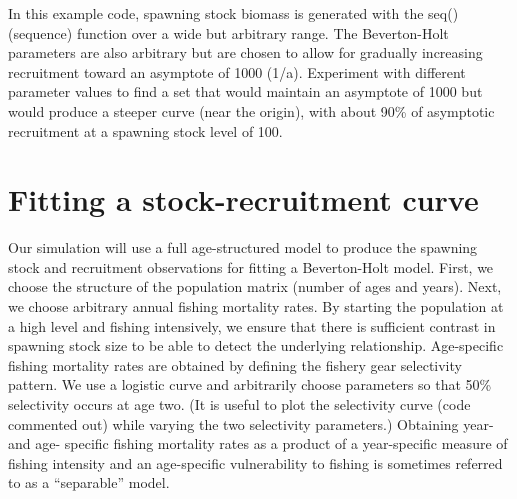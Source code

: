 \documentclass[
]{krantz}
\begin{document}
In this example code, spawning stock biomass is generated with the seq() (sequence) function over a wide but arbitrary range. The Beverton-Holt parameters are also arbitrary but are chosen to allow for gradually increasing recruitment toward an asymptote of 1000 (1/a). Experiment with different parameter values to find a set that would maintain an asymptote of 1000 but would produce a steeper curve (near the origin), with about 90\% of asymptotic recruitment at a spawning stock level of 100.

\hypertarget{Recruit-Fit}{%
\section{Fitting a stock-recruitment curve}\label{Recruit-Fit}}

Our simulation will use a full age-structured model to produce the spawning stock and recruitment observations for fitting a Beverton-Holt model. First, we choose the structure of the population matrix (number of ages and years). Next, we choose arbitrary annual fishing mortality rates. By starting the population at a high level and fishing intensively, we ensure that there is sufficient contrast \citep{hilborn.walters_1992} in spawning stock size to be able to detect the underlying relationship. Age-specific fishing mortality rates are obtained by defining the fishery gear selectivity pattern. We use a logistic curve and arbitrarily choose parameters so that 50\% selectivity occurs at age two. (It is useful to plot the selectivity curve (code commented out) while varying the two selectivity parameters.) Obtaining year- and age- specific fishing mortality rates as a product of a year-specific measure of fishing intensity and an age-specific vulnerability to fishing is sometimes referred to as a ``separable'' model.
\end{document}

